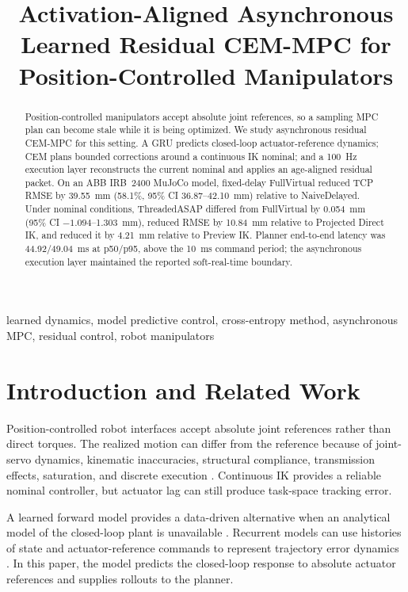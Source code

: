 \documentclass[conference]{IEEEtran}
\title{Activation-Aligned Asynchronous Learned Residual CEM-MPC for Position-Controlled Manipulators}
\author{\IEEEauthorblockN{Anonymous Author(s)}
\IEEEauthorblockA{\textit{Affiliation and contact information omitted for review}}}
\begin{document}
\maketitle

\begin{abstract}
Position-controlled manipulators accept absolute joint references, so a sampling MPC plan can become stale while it is being optimized. We study asynchronous residual CEM-MPC for this setting. A GRU predicts closed-loop actuator-reference dynamics; CEM plans bounded corrections around a continuous IK nominal; and a 100~Hz execution layer reconstructs the current nominal and applies an age-aligned residual packet. On an ABB IRB~2400 MuJoCo model, fixed-delay FullVirtual reduced TCP RMSE by 39.55~mm (58.1\%, 95\% CI 36.87--42.10~mm) relative to NaiveDelayed. Under nominal conditions, ThreadedASAP differed from FullVirtual by 0.054~mm (95\% CI $-1.094$--1.303~mm), reduced RMSE by 10.84~mm relative to Projected Direct IK, and reduced it by 4.21~mm relative to Preview IK. Planner end-to-end latency was 44.92/49.04~ms at p50/p95, above the 10~ms command period; the asynchronous execution layer maintained the reported soft-real-time boundary.
\end{abstract}

\begin{IEEEkeywords}
learned dynamics, model predictive control, cross-entropy method, asynchronous MPC, residual control, robot manipulators
\end{IEEEkeywords}

\section{Introduction and Related Work}
\label{sec:introduction}
Position-controlled robot interfaces accept absolute joint references rather than direct torques. The realized motion can differ from the reference because of joint-servo dynamics, kinematic inaccuracies, structural compliance, transmission effects, saturation, and discrete execution \cite{lee2021nested,lange1994path}. Continuous IK provides a reliable nominal controller, but actuator lag can still produce task-space tracking error.

A learned forward model provides a data-driven alternative when an analytical model of the closed-loop plant is unavailable \cite{hewing2020learning,nagabandi2018neural}. Recurrent models can use histories of state and actuator-reference commands to represent trajectory error dynamics \cite{ma2025trajectory}. In this paper, the model predicts the closed-loop response to absolute actuator references and supplies rollouts to the planner.
\end{document}
